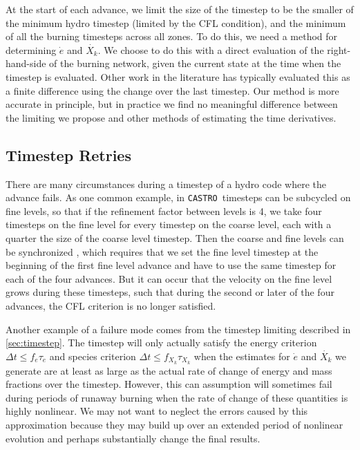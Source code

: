 \documentclass[twocolumn,numberedappendix]{../aastex62}
\newcommand{\castro}{\texttt{CASTRO}}
\begin{document}
At the start of each advance, we limit the size of the timestep to be the smaller
of the minimum hydro timestep (limited by the CFL condition), and the minimum of all the
burning timesteps across all zones. To do this, we need a method for determining 
$\dot{e}$ and $\dot{X_k}$. We choose to do this with a direct evaluation of the
right-hand-side of the burning network, given the current state at the time when
the timestep is evaluated. Other work in the literature has typically evaluated
this as a finite difference using the change over the last timestep. Our method
is more accurate in principle, but in practice we find no meaningful difference
between the limiting we propose and other methods of estimating the time derivatives.



\subsection{Timestep Retries}
\label{sec:retries}

There are many circumstances during a timestep of a hydro code where the advance
fails. As one common example, in \castro\ timesteps can be subcycled on fine levels,
so that if the refinement factor between levels is 4, we take four timesteps on
the fine level for every timestep on the coarse level, each with a quarter the
size of the coarse level timestep. Then the coarse and fine levels can be
synchronized \citep{bergercolella:1989}, which requires that we set the fine level
timestep at the beginning of the first fine level advance and have to use the same
timestep for each of the four advances. But it can occur that the velocity on the
fine level grows during these timesteps, such that during the second or later of
the four advances, the CFL criterion is no longer satisfied.

Another example of a failure mode comes from the timestep limiting described in
\autoref{sec:timestep}. The timestep will only actually satisfy the energy criterion
$\Delta t \leq f_e \tau_e$ and species criterion $\Delta t \leq f_{X_k} \tau_{X_k}$
when the estimates for $\dot{e}$ and $\dot{X_k}$ we generate are at least as large
as the actual rate of change of energy and mass fractions over the timestep. However,
this can assumption will sometimes fail during periods of runaway burning when the
rate of change of these quantities is highly nonlinear. We may not want to neglect
the errors caused by this approximation because they may build up over an extended
period of nonlinear evolution and perhaps substantially change the final results.
\end{document}
